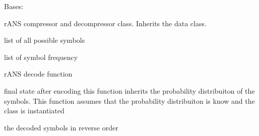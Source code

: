 \documentclass[letterpaper,10pt,english]{sphinxmanual}
\begin{document}
\begin{fulllineitems}
\label{\detokenize{ANS:ANS.rANS}}
\pysigstartsignatures
{}
\pysigstopsignatures
\sphinxAtStartPar
Bases: {\hyperref[\detokenize{core:core.data.Data}]{}}

\sphinxAtStartPar
rANS compressor and decompressor class. Inherits the data class.
\begin{description}
\begin{description}
\sphinxAtStartPar
list of all possible symbols

\sphinxAtStartPar
list of symbol frequency

\end{description}

\end{description}

\begin{fulllineitems}
\label{\detokenize{ANS:ANS.rANS.decode}}
\pysigstartsignatures
{}
\pysigstopsignatures
\sphinxAtStartPar
rANS decode function
\begin{description}
\begin{description}
\sphinxAtStartPar
final state after encoding 
this function inherits the probability distribuiton of the symbols.
This function assumes that the probability distribuiton is know and the class is instantiated

\end{description}

\begin{description}
\sphinxAtStartPar
the decoded symbols in reverse order

\end{description}

\end{description}


\end{fulllineitems}
\end{fulllineitems}
\end{document}
